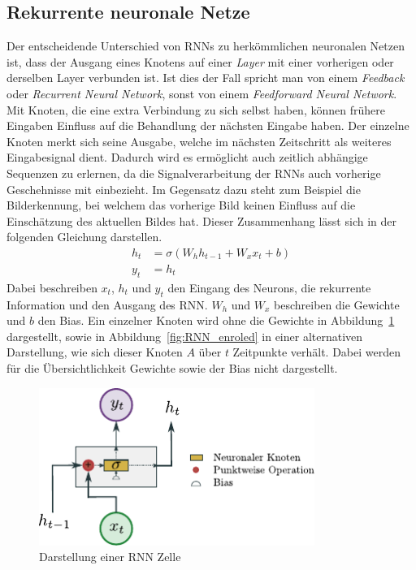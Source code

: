         \subsection{Rekurrente neuronale Netze}\label{sec:RNN}
            Der entscheidende Unterschied von RNNs zu herkömmlichen neuronalen Netzen ist,
            dass der Ausgang eines Knotens auf einer \textit{Layer}  mit einer vorherigen oder derselben Layer verbunden ist.
            Ist dies der Fall spricht man von einem \textit{Feedback} oder \textit{Recurrent Neural Network}, sonst von einem \textit{Feedforward Neural Network}. 
            Mit Knoten, die eine extra Verbindung zu sich selbst haben, können frühere Eingaben Einfluss auf die Behandlung der nächsten Eingabe haben.
            Der einzelne Knoten merkt sich seine Ausgabe, welche im nächsten Zeitschritt als weiteres Eingabesignal dient.
            Dadurch wird es ermöglicht auch zeitlich abhängige Sequenzen zu erlernen, da die Signalverarbeitung der RNNs auch vorherige Geschehnisse mit einbezieht.
            Im Gegensatz dazu steht zum Beispiel die Bilderkennung, bei welchem das vorherige Bild keinen Einfluss auf die Einschätzung des aktuellen Bildes hat.
            Dieser Zusammenhang lässt sich in der folgenden Gleichung darstellen.
            \begin{equation}
                \begin{split}
                    h_t &= \sigma \left(W_{h}h_{t-1} + W_{x}x_{t} + b\right)\\
                    y_t &= h_t
                \end{split}
            \end{equation}
            Dabei beschreiben $x_t$, $h_t$ und $y_t$ den Eingang des Neurons, die rekurrente Information und den Ausgang des RNN\@.
            $W_h$ und  $W_x$ beschreiben die Gewichte und $b$ den Bias.
            Ein einzelner Knoten wird ohne die Gewichte in Abbildung~\ref{fig:RNN} dargestellt,
            sowie in Abbildung~\ref{fig:RNN_enroled} in einer alternativen Darstellung, wie sich dieser Knoten $A$ über $t$ Zeitpunkte verhält.
            Dabei werden für die Übersichtlichkeit Gewichte sowie der Bias nicht dargestellt.
                \begin{figure}[ht]
                    \centering
                    \includegraphics[width=0.8\textwidth]{images/Illustrationen/RNN_simple}
                    \caption{Darstellung einer RNN Zelle}
                    \label{fig:RNN}
                \end{figure}
